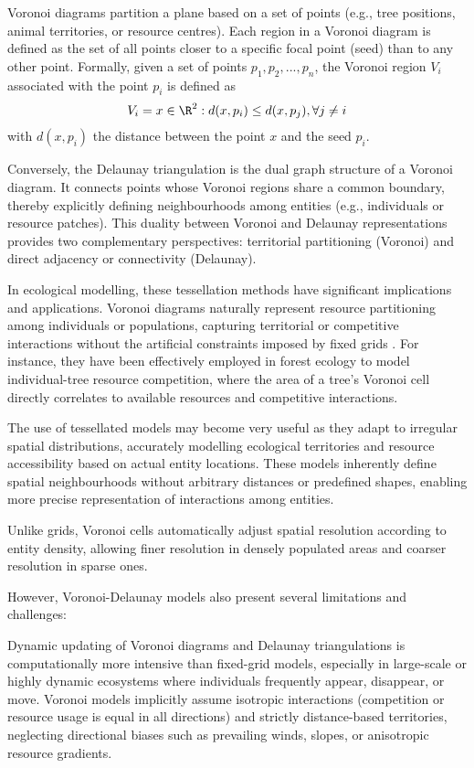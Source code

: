 Voronoi diagrams partition a plane based on a set of points (e.g., tree positions, animal territories, or resource centres). Each region in a Voronoi diagram is defined as the set of all points closer to a specific focal point (seed) than to any other point. Formally, given a set of points ${p_1, p_2, ..., p_n}$, the Voronoi region $V_i$ associated with the point $p_i$ is defined as
\begin{align}
    V_i = { x \in \R^2 : d(x, p_i) \leq d(x, p_j), \forall j \neq i }
\end{align}
with $d(x, p_i)$ the distance between the point $x$ and the seed $p_i$.

Conversely, the Delaunay triangulation is the dual graph structure of a Voronoi diagram. It connects points whose Voronoi regions share a common boundary, thereby explicitly defining neighbourhoods among entities (e.g., individuals or resource patches). This duality between Voronoi and Delaunay representations provides two complementary perspectives: territorial partitioning (Voronoi) and direct adjacency or connectivity (Delaunay).

In ecological modelling, these tessellation methods have significant implications and applications. Voronoi diagrams naturally represent resource partitioning among individuals or populations, capturing territorial or competitive interactions without the artificial constraints imposed by fixed grids \cite{Castle2006}. For instance, they have been effectively employed in forest ecology to model individual-tree resource competition, where the area of a tree's Voronoi cell directly correlates to available resources and competitive interactions.

The use of tessellated models may become very useful as they adapt to irregular spatial distributions, accurately modelling ecological territories and resource accessibility based on actual entity locations. These models inherently define spatial neighbourhoods without arbitrary distances or predefined shapes, enabling more precise representation of interactions among entities.

Unlike grids, Voronoi cells automatically adjust spatial resolution according to entity density, allowing finer resolution in densely populated areas and coarser resolution in sparse ones.

However, Voronoi-Delaunay models also present several limitations and challenges:
\begin{Itemize}
    \Item{} Dynamic updating of Voronoi diagrams and Delaunay triangulations is computationally more intensive than fixed-grid models, especially in large-scale or highly dynamic ecosystems where individuals frequently appear, disappear, or move.
    \Item{} Voronoi models implicitly assume isotropic interactions (competition or resource usage is equal in all directions) and strictly distance-based territories, neglecting directional biases such as prevailing winds, slopes, or anisotropic resource gradients.
\end{Itemize}


